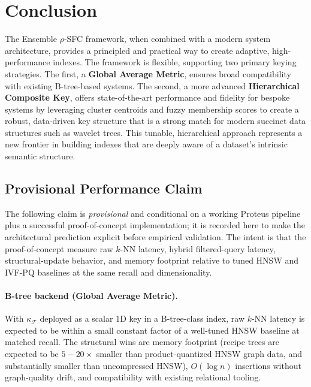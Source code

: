 \documentclass[11pt]{article}
\newcommand{\kappaf}{\kappa_{\mathcal F}}
\begin{document}
\section{Conclusion}
\label{sec:conclusion}
The Ensemble $\rho$-SFC framework, when combined with a modern system architecture, provides a principled and practical way to create adaptive, high-performance indexes. The framework is flexible, supporting two primary keying strategies. The first, a \textbf{Global Average Metric}, ensures broad compatibility with existing B-tree-based systems. The second, a more advanced \textbf{Hierarchical Composite Key}, offers state-of-the-art performance and fidelity for bespoke systems by leveraging cluster centroids and fuzzy membership scores to create a robust, data-driven key structure that is a strong match for modern succinct data structures such as wavelet trees. This tunable, hierarchical approach represents a new frontier in building indexes that are deeply aware of a dataset's intrinsic semantic structure.

\subsection*{Provisional Performance Claim}
\label{sec:provisional-claim}
The following claim is \emph{provisional} and conditional on a working Proteus pipeline plus a successful proof-of-concept implementation; it is recorded here to make the architectural prediction explicit before empirical validation. The intent is that the proof-of-concept measure raw $k$-NN latency, hybrid filtered-query latency, structural-update behavior, and memory footprint relative to tuned HNSW and IVF-PQ baselines at the same recall and dimensionality.

\paragraph{B-tree backend (Global Average Metric).}
With $\kappaf$ deployed as a scalar 1D key in a B-tree-class index, raw $k$-NN latency is expected to be within a small constant factor of a well-tuned HNSW baseline at matched recall. The structural wins are memory footprint (recipe trees are expected to be $5{-}20\times$ smaller than product-quantized HNSW graph data, and substantially smaller than uncompressed HNSW), $O(\log n)$ insertions without graph-quality drift, and compatibility with existing relational tooling.
\end{document}
